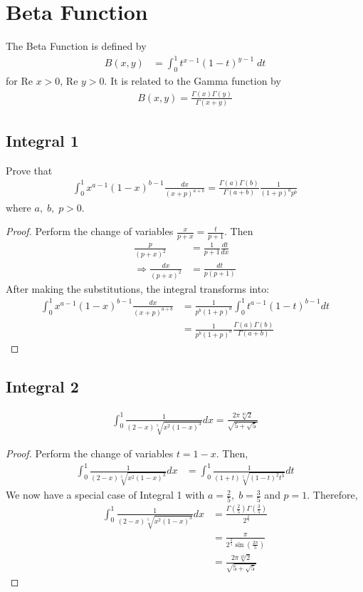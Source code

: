 \section{Beta Function}
The Beta Function is defined by 
\begin{align*}
B(x,y) &= \int_0^1 t^{x-1}(1-t)^{y-1} \; dt
\end{align*}
for $\text{Re }x > 0$, $\text{Re }y>0$. It is related to the Gamma function by
\begin{align*}
B(x,y) = \frac{\Gamma(x)\Gamma(y)}{\Gamma(x+y)}
\end{align*}
\subsection{Integral 1}
Prove that
\begin{align*} \int_0^1 x^{a-1}(1-x)^{b-1} \frac{dx}{(x+p)^{a+b}} = \frac{\Gamma(a)\Gamma(b)}{\Gamma(a+b)}\frac{1}{(1+p)^{a} p^b}\end{align*}
where $a,\; b, \; p   >0$.
\begin{proof}
Perform the change of variables $\displaystyle \frac{x}{p+x}=\frac{t}{p+1}$. Then
\begin{align*}\frac{p}{(p+x)^{2}}&= \frac{1}{p+1}\frac{dt}{dx} \\ \Rightarrow \frac{dx}{(p+x)^{2}} &=\frac{dt}{p(p+1)}\end{align*}
After making the substitutions, the integral transforms into:
\begin{align*}
 \int_0^1 x^{a-1}(1-x)^{b-1} \frac{dx}{(x+p)^{a+b}} &= \frac{1}{p^b (1+p)^a}\int_0^1 t^{a-1}(1-t)^{b-1} dt \\
&= \frac{1}{p^b (1+p)^a} \frac{\Gamma(a)\Gamma(b)}{\Gamma(a+b)}
\end{align*}
\end{proof}

\subsection{Integral 2}
\begin{align*}
\int_{0}^{1}\frac{1}{(2-x)\sqrt[5]{x^{2}(1-x)^{3}}}dx = \frac{2\pi \sqrt[10]{2}}{\sqrt{5+\sqrt{5}}}
\end{align*}
\begin{proof}
Perform the change of variables $t=1-x$. Then, 
\begin{align*}
\int_0^1 \frac{1}{(2-x)\sqrt[5]{x^2(1-x)^3}}dx &= \int_0^1 \frac{1}{(1+t)\sqrt[5]{(1-t)^2 t^3}}dt
\end{align*}
We now have a special case of Integral 1 with $a=\frac{2}{5}, \; b=\frac{3}{5}$ and $p=1$. Therefore,
\begin{align*}
\int_0^1 \frac{1}{(2-x)\sqrt[5]{x^2(1-x)^3}}dx  &= \frac{ \Gamma \left(\frac{2}{5} \right)\Gamma \left(\frac{3}{5} \right)}{2^{\frac{2}{5}}}\\
&= \frac{\pi}{2^{\frac{2}{5}} \sin \left( \frac{2\pi}{5}\right)} \\
&= \frac{2\pi \sqrt[10]{2}}{\sqrt{5+\sqrt{5}}}
\end{align*}
\end{proof}
